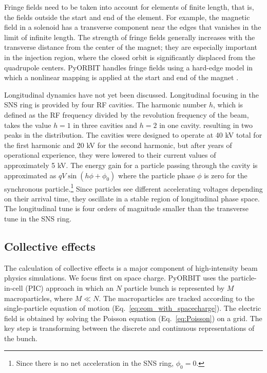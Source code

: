 Fringe fields need to be taken into account for elements of finite length, that is, the fields outside the start and end of the element. For example, the magnetic field in a solenoid has a transverse component near the edges that vanishes in the limit of infinite length. The strength of fringe fields generally increases with the transverse distance from the center of the magnet; they are especially important in the injection region, where the closed orbit is significantly displaced from the quadrupole centers. PyORBIT handles fringe fields using a hard-edge model in which a nonlinear mapping is applied at the start and end of the magnet \cite{Forest1998}.

Longitudinal dynamics have not yet been discussed. Longitudinal focusing in the SNS ring is provided by four RF cavities. The harmonic number $h$, which is defined as the RF frequency divided by the revolution frequency of the beam, takes the value $h = 1$ in three cavities and $h = 2$ in one cavity. resulting in two peaks in the distribution. The cavities were designed to operate at 40 kV total for the first harmonic and 20 kV for the second harmonic, but after years of operational experience, they were lowered to their current values of approximately 5 kV. The energy gain for a particle passing through the cavity is approximated as $q V \sin(h \phi + \phi_0)$ where the particle phase $\phi$ is zero for the synchronous particle.\footnote{Since there is no net acceleration in the SNS ring, $\phi_0 = 0$.} Since particles see different accelerating voltages depending on their arrival time, they oscillate in a stable region of longitudinal phase space. The longitudinal tune is four orders of magnitude smaller than the transverse tune in the SNS ring.



\subsection{Collective effects}

The calculation of collective effects is a major component of high-intensity beam physics simulations. We focus first on space charge. PyORBIT uses the particle-in-cell (PIC) approach in which an $N$ particle bunch is represented by $M$ macroparticles, where $M \ll N$. The macroparticles are tracked according to the single-particle equation of motion (Eq.~\eqref{eq:eom_with_spacecharge}). The electric field is obtained by solving the Poisson equation (Eq.~\eqref{eq:Poisson}) on a grid. The key step is transforming between the discrete and continuous representations of the bunch.

